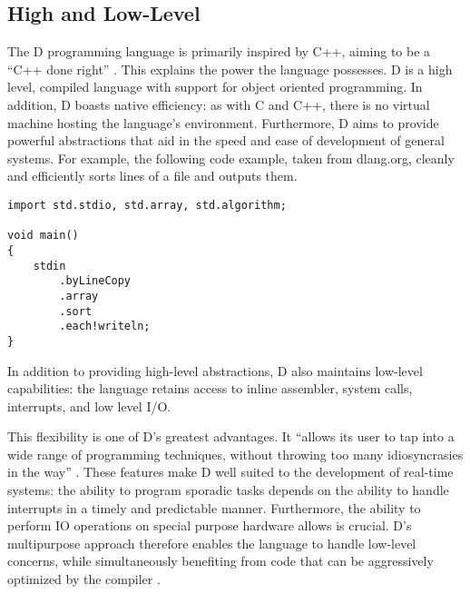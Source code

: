 \subsection{High and Low-Level}
The D programming language is primarily inspired by C++, aiming to be a ``C++ done
right'' 
\cite{qznc-tutorial}. 
This explains the power the language possesses. D is a high level, compiled 
language with support for object oriented programming. In addition, D boasts 
native efficiency: as with C and C++, there is no virtual 
machine hosting the language's environment.
Furthermore, D aims to provide
powerful abstractions that aid in the speed and ease of development of general systems. 
For example, the following code example, taken from dlang.org, cleanly and efficiently 
sorts lines of a file and outputs them. 
\begin{lstlisting}[basicstyle=\small]
import std.stdio, std.array, std.algorithm;

void main()
{
    stdin
        .byLineCopy
        .array
        .sort
        .each!writeln;
}
\end{lstlisting}
In addition to providing high-level abstractions, D also maintains low-level 
capabilities: the language retains access to inline assembler, system calls, 
interrupts, and low level I/O.
\par\bigskip\noindent
This flexibility is one of D's greatest advantages. It ``allows its user to tap 
into a wide range of programming techniques, without throwing too many 
idiosyncrasies in the way'' \cite{ddili-book}. 
These features make D well suited to the development of real-time systems: 
the ability to program sporadic tasks depends on the ability to handle 
interrupts in a timely and predictable manner.
Furthermore, the ability to perform IO operations on special purpose hardware
allows is crucial.
D's multipurpose approach therefore enables the language to handle low-level concerns,
while simultaneously benefiting from code that can be aggressively optimized by the
compiler \cite{dlang-overview}.

